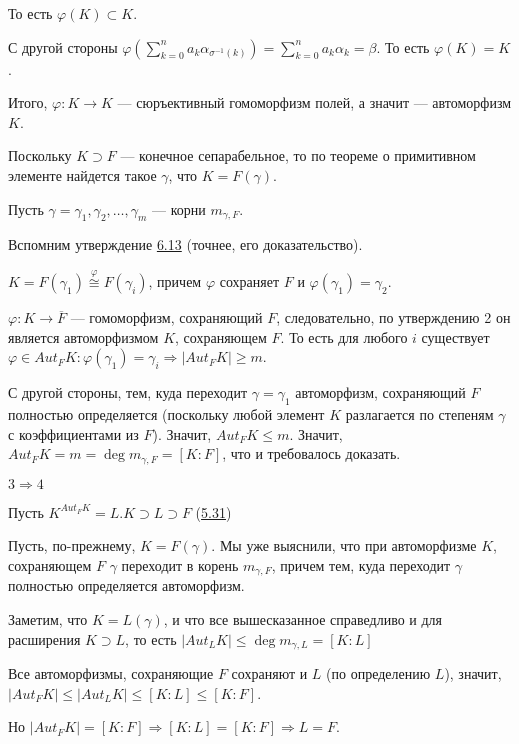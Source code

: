 То есть \(\varphi(K) \subset K\).

С другой стороны \(\varphi(\sum\limits_{k = 0}^n a_k \alpha_{\sigma^{-1}(k)}) = \sum\limits_{k = 0}^n a_k \alpha_k = \beta\). То есть \(\varphi(K) = K\).

Итого, \(\varphi:K \to K\) --- сюръективный гомоморфизм полей, а значит --- автоморфизм \(K\).

Поскольку \(K \supset F\) --- конечное сепарабельное, то по теореме о примитивном элементе найдется такое \(\gamma\), что \(K = F(\gamma)\).

Пусть \(\gamma = \gamma_1, \gamma_2, \ldots, \gamma_m\) --- корни \(m_{\gamma, F}\).

Вспомним утверждение \hyperlink{6.13}{6.13} (точнее, его доказательство).

\(K = F(\gamma_1) \stackrel{\varphi}{\cong} F(\gamma_i)\), причем \(\varphi\) сохраняет \(F\) и \(\varphi(\gamma_1) = \gamma_2\).

\(\varphi: K \to \overline{F}\) --- гомоморфизм, сохраняющий \(F\), следовательно, по утверждению 2 он является автоморфизмом \(K\), сохраняющем \(F\). То есть для любого \(i\) существует \(\varphi \in Aut_FK: \varphi(\gamma_1) = \gamma_i \Rightarrow |Aut_FK| \geqslant m\).

С другой стороны, тем, куда переходит \(\gamma = \gamma_1\) автоморфизм, сохраняющий \(F\) полностью определяется (поскольку любой элемент \(K\) разлагается по степеням \(\gamma\) с коэффициентами из \(F\)). Значит, \(Aut_FK \leqslant m\). Значит, \(Aut_FK = m = \deg m_{\gamma, F} = [K : F]\), что и требовалось доказать.

\(3 \Rightarrow 4\)

Пусть \(K^{Aut_FK} = L. K \supset L \supset F\) (\hyperlink{5.31}{5.31})

Пусть, по-прежнему, \(K = F(\gamma)\). Мы уже выяснили, что при автоморфизме \(K\), сохраняющем \(F\) \(\gamma\) переходит в корень \(m_{\gamma, F}\), причем тем, куда переходит \(\gamma\) полностью определяется автоморфизм.

Заметим, что \(K = L(\gamma)\), и что все вышесказанное справедливо и для расширения \(K \supset L\), то есть \(|Aut_LK| \leqslant \deg m_{\gamma, L} = [K : L]\)

Все автоморфизмы, сохраняющие \(F\) сохраняют и \(L\) (по определению \(L\)), значит, \(|Aut_FK| \leqslant |Aut_LK| \leqslant [K : L] \leqslant [K : F]\).

Но \(|Aut_FK| = [K : F] \Rightarrow [K : L] = [K : F] \Rightarrow L = F\).


